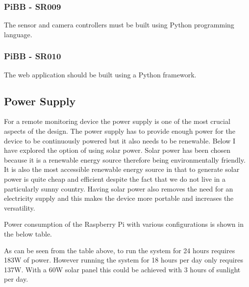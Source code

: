 \documentclass[10pt,a4paper]{article}
\begin{document}
\subsubsection{PiBB - SR009}
The sensor and camera controllers must be built using Python programming language.
\subsubsection{PiBB - SR010}
The web application should be built using a Python framework.
\subsection{Power Supply}
For a remote monitoring device the power supply is one of the most crucial aspects of the design. The power supply has to provide enough power for the device to be continuously powered but it also needs to be renewable. Below I have explored the option of using solar power.
Solar power has been chosen because it is a renewable energy source therefore being environmentally friendly. It is also the most accessible renewable energy source in that to generate solar power is quite cheap and efficient despite the fact that we do not live in a particularly sunny country. Having solar power also removes the need for an electricity supply and this makes the device more portable and increases the versatility. 

Power consumption of the Raspberry Pi with various configurations is shown in the below table. 

\begin{table}
  \centering
  \caption{Monitoring system power requirements}
  \label{tab:powerRequirements}
  \end{table}

As can be seen from the table above, to run the system for 24 hours requires 183W of power. However running the system for 18 hours per day only requires 137W. With a 60W solar panel this could be achieved with 3 hours of sunlight per day. 
\end{document}
